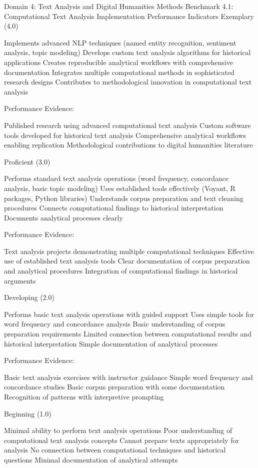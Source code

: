 \begin{appendices}
Domain 4: Text Analysis and Digital Humanities Methods
Benchmark 4.1: Computational Text Analysis Implementation
Performance Indicators
Exemplary (4.0)

Implements advanced NLP techniques (named entity recognition, sentiment analysis, topic modeling)
Develops custom text analysis algorithms for historical applications
Creates reproducible analytical workflows with comprehensive documentation
Integrates multiple computational methods in sophisticated research designs
Contributes to methodological innovation in computational text analysis

Performance Evidence:

Published research using advanced computational text analysis
Custom software tools developed for historical text analysis
Comprehensive analytical workflows enabling replication
Methodological contributions to digital humanities literature

Proficient (3.0)

Performs standard text analysis operations (word frequency, concordance analysis, basic topic modeling)
Uses established tools effectively (Voyant, R packages, Python libraries)
Understands corpus preparation and text cleaning procedures
Connects computational findings to historical interpretation
Documents analytical processes clearly

Performance Evidence:

Text analysis projects demonstrating multiple computational techniques
Effective use of established text analysis tools
Clear documentation of corpus preparation and analytical procedures
Integration of computational findings in historical arguments

Developing (2.0)

Performs basic text analysis operations with guided support
Uses simple tools for word frequency and concordance analysis
Basic understanding of corpus preparation requirements
Limited connection between computational results and historical interpretation
Simple documentation of analytical processes

Performance Evidence:

Basic text analysis exercises with instructor guidance
Simple word frequency and concordance studies
Basic corpus preparation with some documentation
Recognition of patterns with interpretive prompting

Beginning (1.0)

Minimal ability to perform text analysis operations
Poor understanding of computational text analysis concepts
Cannot prepare texts appropriately for analysis
No connection between computational techniques and historical questions
Minimal documentation of analytical attempts


\end{appendices}
